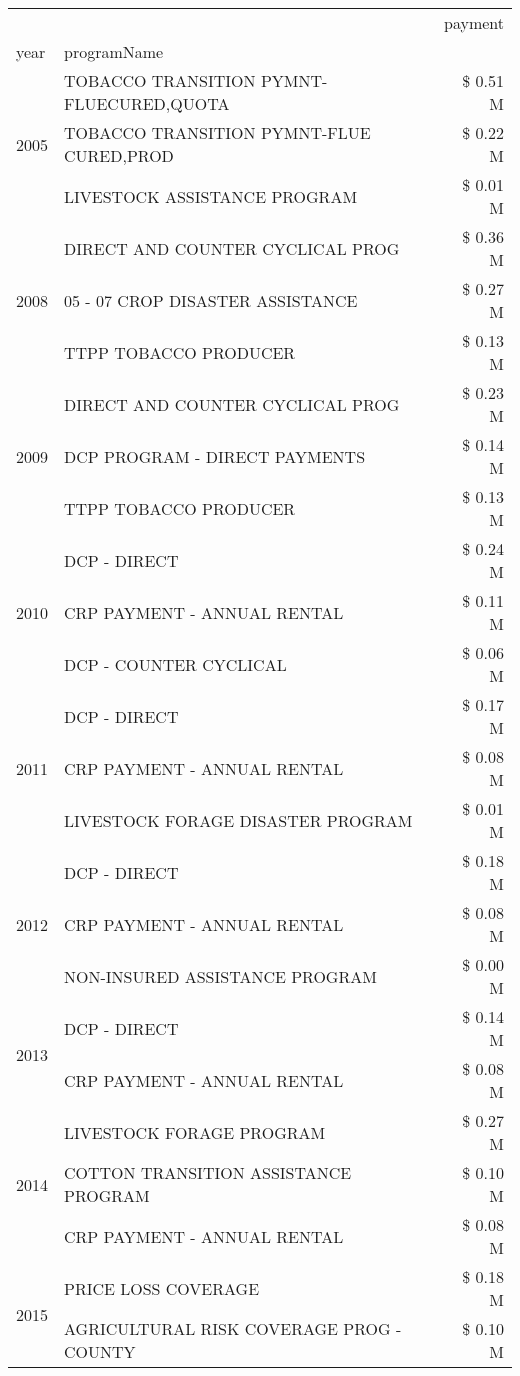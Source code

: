 \begin{tabular}{llr}
\toprule
 &  & payment \\
year & programName &  \\
\midrule
\multirow[t]{3}{*}{2005} & TOBACCO TRANSITION PYMNT-FLUECURED,QUOTA & \$ 0.51 M \\
 & TOBACCO TRANSITION PYMNT-FLUE CURED,PROD & \$ 0.22 M \\
 & LIVESTOCK ASSISTANCE PROGRAM & \$ 0.01 M \\
\cline{1-3}
\multirow[t]{3}{*}{2008} & DIRECT AND COUNTER CYCLICAL PROG & \$ 0.36 M \\
 & 05 - 07 CROP DISASTER ASSISTANCE & \$ 0.27 M \\
 & TTPP TOBACCO PRODUCER & \$ 0.13 M \\
\cline{1-3}
\multirow[t]{3}{*}{2009} & DIRECT AND COUNTER CYCLICAL PROG & \$ 0.23 M \\
 & DCP PROGRAM - DIRECT PAYMENTS & \$ 0.14 M \\
 & TTPP TOBACCO PRODUCER & \$ 0.13 M \\
\cline{1-3}
\multirow[t]{3}{*}{2010} & DCP - DIRECT & \$ 0.24 M \\
 & CRP PAYMENT - ANNUAL RENTAL & \$ 0.11 M \\
 & DCP - COUNTER CYCLICAL & \$ 0.06 M \\
\cline{1-3}
\multirow[t]{3}{*}{2011} & DCP - DIRECT & \$ 0.17 M \\
 & CRP PAYMENT - ANNUAL RENTAL & \$ 0.08 M \\
 & LIVESTOCK FORAGE DISASTER PROGRAM & \$ 0.01 M \\
\cline{1-3}
\multirow[t]{3}{*}{2012} & DCP - DIRECT & \$ 0.18 M \\
 & CRP PAYMENT - ANNUAL RENTAL & \$ 0.08 M \\
 & NON-INSURED ASSISTANCE PROGRAM & \$ 0.00 M \\
\cline{1-3}
\multirow[t]{2}{*}{2013} & DCP - DIRECT & \$ 0.14 M \\
 & CRP PAYMENT - ANNUAL RENTAL & \$ 0.08 M \\
\cline{1-3}
\multirow[t]{3}{*}{2014} & LIVESTOCK FORAGE PROGRAM & \$ 0.27 M \\
 & COTTON TRANSITION ASSISTANCE PROGRAM & \$ 0.10 M \\
 & CRP PAYMENT - ANNUAL RENTAL & \$ 0.08 M \\
\cline{1-3}
\multirow[t]{3}{*}{2015} & PRICE LOSS COVERAGE & \$ 0.18 M \\
 & AGRICULTURAL RISK COVERAGE PROG - COUNTY & \$ 0.10 M \\

\end{tabular}
